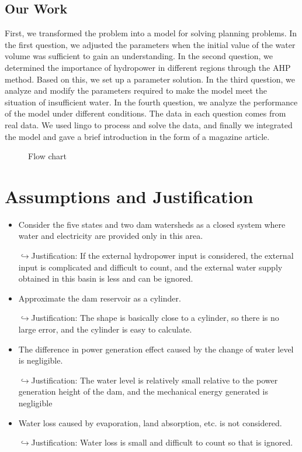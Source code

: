 \documentclass{mcmthesis}
\begin{document}
\subsection{Our Work}
First, we transformed the problem into a model for solving planning problems. In the first question, we adjusted the parameters when the initial value of the water volume was sufficient to gain an understanding. In the second question, we determined the importance of hydropower in different regions through the AHP method. Based on this, we set up a parameter solution. In the third question, we analyze and modify the parameters required to make the model meet the situation of insufficient water. In the fourth question, we analyze the performance of the model under different conditions. The data in each question comes from real data. We used lingo to process and solve the data, and finally we integrated the model and gave a brief introduction in the form of a magazine article.
\begin{figure}[h]
	\caption{Flow chart}
\end{figure}
\section{Assumptions and Justification}

\begin{itemize}
\item Consider the five states and two dam watersheds as a closed system where water and electricity are provided only in this area.

$\hookrightarrow$Justification: If the external hydropower input is considered, the external input is complicated and difficult to count, and the external water supply obtained in this basin is less and can be ignored.

\item Approximate the dam reservoir as a cylinder.

$\hookrightarrow$Justification: The shape is basically close to a cylinder, so there is no large error, and the cylinder is easy to calculate.

\item The difference in power generation effect caused by the change of water level is negligible.

$\hookrightarrow$Justification: The water level is relatively small relative to the power generation height of the dam, and the mechanical energy generated is negligible

\item Water loss caused by evaporation, land absorption, etc. is not considered.

$\hookrightarrow$Justification: Water loss is small and difficult to count so that is ignored. 
\end{itemize}
\end{document}
